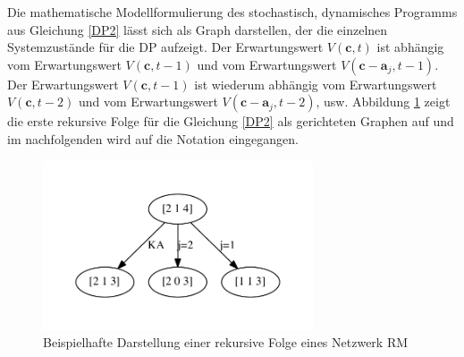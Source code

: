 Die mathematische Modellformulierung des stochastisch, dynamisches Programms aus Gleichung \eqref{DP2} lässt sich als Graph darstellen, der die einzelnen Systemzustände für die DP aufzeigt. Der Erwartungswert $V(\textbf{c},t)$ ist abhängig vom Erwartungswert $V(\textbf{c},t-1)$ und vom Erwartungswert $V(\textbf{c}-\textbf{a}_{j},t-1)$. Der Erwartungswert $V(\textbf{c},t-1)$ ist wiederum abhängig vom Erwartungswert $V(\textbf{c},t-2)$ und vom Erwartungswert $V(\textbf{c}-\textbf{a}_{j},t-2)$, usw. Abbildung \ref{B0} zeigt die erste rekursive Folge für die Gleichung \eqref{DP2} als gerichteten Graphen auf und im nachfolgenden wird auf die Notation eingegangen.
\begin{figure}[h!]
  \begin{center}
    \includegraphics[width=80mm]{Bilder/Beispiel0.pdf}
    \caption{Beispielhafte Darstellung einer rekursive Folge eines Netzwerk RM}  \label{B0}
  \end{center}
\end{figure}

